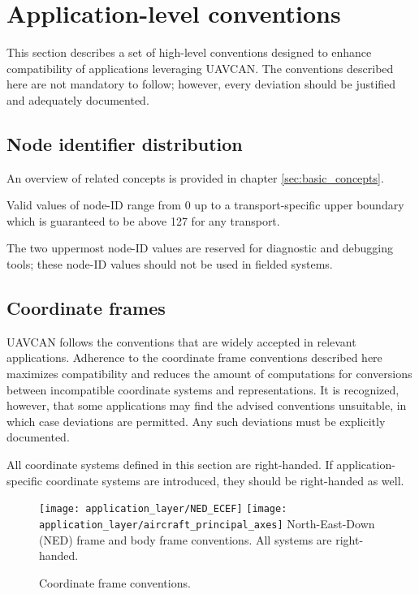 \section{Application-level conventions}\label{sec:application_level_conventions}

This section describes a set of high-level conventions designed to enhance compatibility
of applications leveraging UAVCAN.
The conventions described here are not mandatory to follow;
however, every deviation should be justified and adequately documented. %

\subsection{Node identifier distribution}

An overview of related concepts is provided in chapter \ref{sec:basic_concepts}.

Valid values of node-ID range from 0 up to a transport-specific upper boundary
which is guaranteed to be above 127 for any transport.

The two uppermost node-ID values are reserved for diagnostic and debugging tools;
these node-ID values should not be used in fielded systems.

\subsection{Coordinate frames}

UAVCAN follows the conventions that are widely accepted in relevant applications.
Adherence to the coordinate frame conventions described here maximizes compatibility and
reduces the amount of computations for conversions between incompatible coordinate systems and
representations.
It is recognized, however, that some applications may find the advised conventions unsuitable,
in which case deviations are permitted.
Any such deviations must be explicitly documented.

All coordinate systems defined in this section are right-handed.
If application-specific coordinate systems are introduced, they should be right-handed as well.

\begin{figure}[hbt]
    \centering
	\texttt{[image: application\_layer/NED\_ECEF]}
    \texttt{[image: application\_layer/aircraft\_principal\_axes]}
    North-East-Down (NED) frame and body frame conventions. All systems are right-handed.
    \caption{
        Coordinate frame conventions.
        \label{fig:application_coordinate_frame_conventions}
    }
\end{figure}

